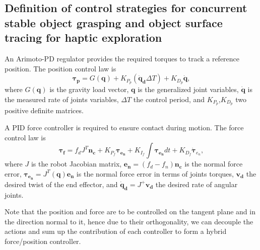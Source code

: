 
\subsection{Definition of control strategies for concurrent stable object grasping and object surface tracing for haptic exploration}

An Arimoto-PD regulator provides the required torques to track a reference position. The position control law is
\begin{equation}
    \bm{\tau_p} = G(\bm{q}) + K_{P_p} \left(\bm{\dot{q}_d}\Delta T\right) + K_{D_p}\bm{\dot{q}},
\end{equation}
where $G(\bm{q})$ is the gravity load vector, $\bm{{q}}$  is the generalized joint variables, $\bm{\dot{q}}$ is the measured rate of joints variables, $\Delta T$ the control period, and $K_{P_p}$,$K_{D_p}$ two positive definite matrices.


A PID force controller is required to ensure contact during motion. The force control law is
\begin{equation}
    \bm{\tau_f} = f_dJ^T\bm{n_c} + K_{P_f}\bm{\tau_{e_n}} + K_{I_f}\int\bm{\tau_{e_n}}dt + K_{D_f}\dot{\bm{\tau}}_{e_n},
\end{equation}
where $J$ is the robot Jacobian matrix, $\bm{e_n} = (f_d - f_n)\bm{n_c}$ is the normal force error, $\bm{\tau_{e_n}} = J^T(\bm{q})\bm{e_n}$ is the normal force error in terms of joints torques, $\bm{v_d}$ the desired twist of the end effector, and $\bm{\dot{q}_d} = J^+\bm{v_d}$ the desired rate of angular joints.

Note that the position and force are to be controlled on the tangent plane and in the direction normal to it, hence due to their orthogonality, we can decouple the actions and sum up the contribution of each controller to form a hybrid force/position controller.

